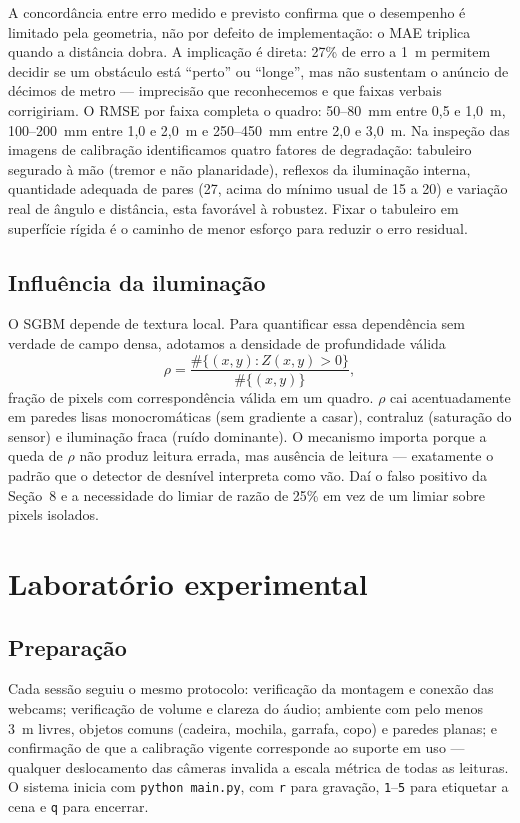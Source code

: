 \documentclass[12pt]{article}
\begin{document}
A concordância entre erro medido e previsto confirma que o desempenho é
limitado pela geometria, não por defeito de implementação: o MAE triplica
quando a distância dobra. A implicação é direta: 27\% de erro a 1~m permitem
decidir se um obstáculo está ``perto'' ou ``longe'', mas não sustentam o
anúncio de décimos de metro --- imprecisão que reconhecemos e que faixas
verbais corrigiriam. O RMSE por faixa completa o quadro: 50--80~mm entre 0,5 e
1,0~m, 100--200~mm entre 1,0 e 2,0~m e 250--450~mm entre 2,0 e 3,0~m. Na
inspeção das imagens de calibração identificamos quatro fatores de degradação:
tabuleiro segurado à mão (tremor e não planaridade), reflexos da iluminação
interna, quantidade adequada de pares (27, acima do mínimo usual de 15 a 20) e
variação real de ângulo e distância, esta favorável à robustez. Fixar o
tabuleiro em superfície rígida é o caminho de menor esforço para reduzir o erro
residual.

\subsection{Influência da iluminação}

O SGBM depende de textura local. Para quantificar essa dependência sem
verdade de campo densa, adotamos a densidade de profundidade válida
\begin{equation}
\rho = \frac{\#\{(x,y) : Z(x,y) > 0\}}{\#\{(x,y)\}},
\end{equation}
fração de pixels com correspondência válida em um quadro. $\rho$ cai
acentuadamente em paredes lisas monocromáticas (sem gradiente a casar),
contraluz (saturação do sensor) e iluminação fraca (ruído dominante). O
mecanismo importa porque a queda de $\rho$ não produz leitura errada, mas
ausência de leitura --- exatamente o padrão que o detector de desnível
interpreta como vão. Daí o falso positivo da Seção~8 e a necessidade do limiar
de razão de 25\% em vez de um limiar sobre pixels isolados.

\section{Laboratório experimental}

\subsection{Preparação}

Cada sessão seguiu o mesmo protocolo: verificação da montagem e conexão das
webcams; verificação de volume e clareza do áudio; ambiente com pelo menos 3~m
livres, objetos comuns (cadeira, mochila, garrafa, copo) e paredes planas; e
confirmação de que a calibração vigente corresponde ao suporte em uso ---
qualquer deslocamento das câmeras invalida a escala métrica de todas as
leituras. O sistema inicia com \texttt{python main.py}, com \texttt{r} para
gravação, \texttt{1}--\texttt{5} para etiquetar a cena e \texttt{q} para
encerrar.
\end{document}
